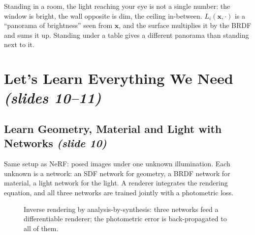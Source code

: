 \documentclass[11pt,a4paper]{article}
\theoremstyle{definition}
\theoremstyle{plain}
\theoremstyle{remark}
\newcommand{\slides}[2]{\texorpdfstring{\emph{(slides #1--#2)}}{(slides #1-#2)}}
\newcommand{\slideone}[1]{\texorpdfstring{\emph{(slide #1)}}{(slide #1)}}
\newcommand{\x}{{\bm{x}}}
\newcommand{\Li}{L_i}
\begin{document}
\begin{intuition}
Standing in a room, the light reaching your eye is not a single number: the window is bright, the wall opposite is dim, the ceiling in-between. $\Li(\x,\cdot)$ is a ``panorama of brightness'' seen from $\x$, and the surface multiplies it by the BRDF and sums it up. Standing under a table gives a different panorama than standing next to it.
\end{intuition}

\section{Let's Learn Everything We Need \slides{10}{11}}

\subsection{Learn Geometry, Material and Light with Networks \slideone{10}}

Same setup as NeRF: posed images under one unknown illumination. Each unknown is a network: an SDF network for geometry, a BRDF network for material, a light network for the light. A renderer integrates the rendering equation, and all three networks are trained jointly with a photometric loss.

\begin{figure}[!htbp]\centering
{}
\caption{Inverse rendering by analysis-by-synthesis: three networks feed a differentiable renderer; the photometric error is back-propagated to all of them.}
\end{figure}
\end{document}
